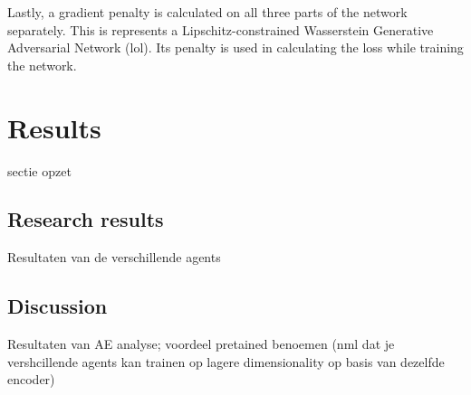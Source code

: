 Lastly, a gradient penalty is calculated on all three parts of the network separately. This is represents a Lipschitz-constrained Wasserstein Generative Adversarial Network (lol). Its penalty is used in calculating the loss while training the network. 


\section{Results}\label{research-results}
sectie opzet
\subsection{Research results}
Resultaten van de verschillende agents

\subsection{Discussion}
Resultaten van AE analyse; voordeel pretained benoemen (nml dat je vershcillende agents kan trainen op lagere dimensionality op basis van dezelfde encoder)


